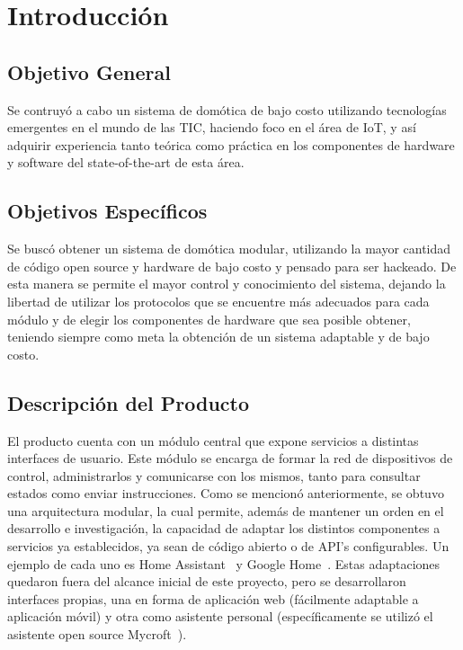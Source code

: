 \chapter{Introducción}

\section{Objetivo General}

Se contruyó a cabo un sistema de domótica de bajo costo utilizando tecnologías emergentes en el mundo de las TIC, haciendo foco en el área de IoT, y así adquirir experiencia tanto teórica como práctica en los componentes de hardware y software del state-of-the-art de esta área.

\section{Objetivos Específicos}

Se buscó obtener un sistema de domótica modular, utilizando la mayor cantidad de código open source y hardware de bajo costo y pensado para ser hackeado. De esta manera se permite el mayor control y conocimiento del sistema, dejando la libertad de utilizar los protocolos que se encuentre más adecuados para cada módulo y de elegir los componentes de hardware que sea posible obtener, teniendo siempre como meta la obtención de un sistema adaptable y de bajo costo.

\section{Descripción del Producto}

El producto cuenta con un módulo central que expone servicios a distintas interfaces de usuario. Este módulo se encarga de formar la red de dispositivos de control, administrarlos y comunicarse con los mismos, tanto para consultar estados como enviar instrucciones. 
Como se mencionó anteriormente, se obtuvo una arquitectura modular, la cual permite, además de mantener un orden en el desarrollo e investigación, la capacidad de adaptar los distintos componentes a servicios ya establecidos, ya sean de código abierto o de API's configurables. Un ejemplo de cada uno es Home Assistant~\cite{HomeAssistant} y Google Home~\cite{GoogleHome}.
Estas adaptaciones quedaron fuera del alcance inicial de este proyecto, pero se desarrollaron interfaces propias, una en forma de aplicación web (fácilmente adaptable a aplicación móvil) y otra como asistente personal (específicamente se utilizó el asistente open source Mycroft~\cite{Mycroft}).

